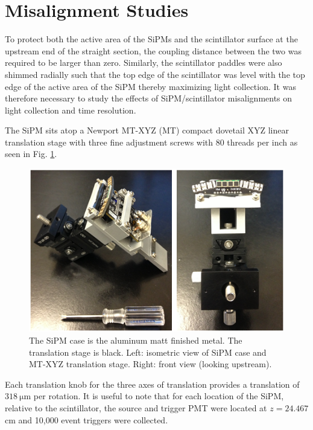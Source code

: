 \section{Misalignment Studies} \label{sec:misalign}

To protect both the active area of the SiPMs and the scintillator surface at the upstream end of the straight section, the coupling distance between the two was required to be larger than zero.  Similarly, the scintillator paddles were also shimmed radially such that the top edge of the scintillator was level with the top edge of the active area of the SiPM thereby maximizing light collection.  It was therefore necessary to study the effects of SiPM/scintillator misalignments on light collection and time resolution.

The SiPM sits atop a Newport MT-XYZ (MT) compact dovetail XYZ linear translation stage with three fine adjustment screws with 80 threads per inch as seen in Fig. \ref{fig:sipm_trans_stage}.  
\begin{figure}[!htb]
	\centering
	\includegraphics[width=1.0\columnwidth]{misalignment/figs/sipm_trans_stage}
	\caption{The SiPM case is the aluminum matt finished metal.  The translation stage is black. Left: isometric view of SiPM case and MT-XYZ translation stage.  Right:  front view (looking upstream).}
	\label{fig:sipm_trans_stage}
\end{figure}
Each translation knob for the three axes of translation provides a translation of $318\ \mathrm{\mu m}$ per rotation.  It is useful to note that for each location of the SiPM, relative to the scintillator, the source and trigger PMT were located at $z = 24.467$ cm and 10,000 event triggers were collected.  %

